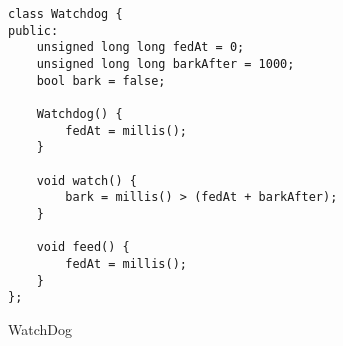 \begin{code}
\begin{verbatim}
class Watchdog {
public:
    unsigned long long fedAt = 0;
    unsigned long long barkAfter = 1000;
    bool bark = false;

    Watchdog() {
        fedAt = millis();
    }

    void watch() {
        bark = millis() > (fedAt + barkAfter);
    }

    void feed() {
        fedAt = millis();
    }
};
\end{verbatim}
\caption{WatchDog}
\end{code}